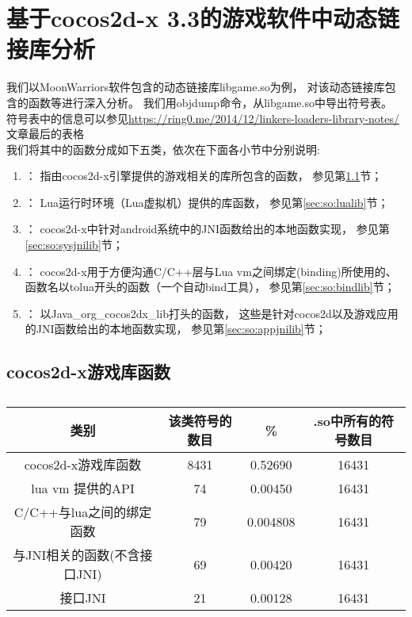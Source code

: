 \section{基于cocos2d-x 3.3的游戏软件中动态链接库分析}
\label{soanalysis}
我们以MoonWarriors软件包含的动态链接库libgame.so为例，
对该动态链接库包含的函数等进行深入分析。
我们用objdump命令，从libgame.so中导出符号表。
符号表中的信息可以参见\url{https://ring0.me/2014/12/linkers-loaders-library-notes/}文章最后的表格\\
我们将其中的函数分成如下五类，依次在下面各小节中分别说明:
\begin{enumerate}
\item {}：
	指由cocos2d-x引擎提供的游戏相关的库所包含的函数，
	参见第\ref{sec:so:cocolib}节；
\item {}：
	Lua运行时环境（Lua虚拟机）提供的库函数，
	参见第\ref{sec:so:lualib}节；
\item {}：
	cocos2d-x中针对android系统中的JNI函数给出的本地函数实现，
	参见第\ref{sec:so:sysjnilib}节；
\item {}：
	cocos2d-x用于方便沟通C/C++层与Lua vm之间绑定(binding)所使用的、
	函数名以tolua开头的函数（一个自动bind工具），
	参见第\ref{sec:so:bindlib}节；
\item {}：
	以Java\_org\_cocos2dx\_lib打头的函数，
	这些是针对cocos2d以及游戏应用的JNI函数给出的本地函数实现，
	参见第\ref{sec:so:appjnilib}节；
\end{enumerate}

\subsection{cocos2d-x游戏库函数}
\label{sec:so:cocolib}

\begin{table}[H]
\caption{}
\begin{tabular}{|c|c|c|c|}
\hline 类别 & 该类符号的数目 & \% & .so中所有的符号数目\\
\hline cocos2d-x游戏库函数& 8431 & 0.52690 & 16431  \\
\hline  lua vm 提供的API & 74 & 0.00450 & 16431 \\
\hline C/C++与lua之间的绑定函数 & 79 &  0.004808 & 16431 \\
\hline 与JNI相关的函数(不含接口JNI) & 69 & 0.00420 & 16431 \\
\hline 接口JNI & 21 & 0.00128 & 16431 \\
\hline
\end{tabular}
\end{table}

